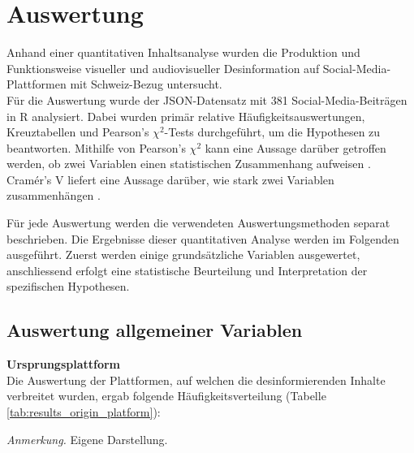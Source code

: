 \documentclass[12pt,a4paper]{article}        %
\begin{document}
\pagebreak
\section{Auswertung}
\label{sec:results}
Anhand einer quantitativen Inhaltsanalyse wurden die Produktion und Funktionsweise visueller und audiovisueller Desinformation auf Social-Media-Plattformen mit Schweiz-Bezug untersucht.\\
Für die Auswertung wurde der JSON-Datensatz mit 381 Social-Media-Beiträgen in R analysiert. Dabei wurden primär relative Häufigkeitsauswertungen, Kreuztabellen und Pearson’s \(\chi^2\)-Tests durchgeführt, um die Hypothesen zu beantworten. Mithilfe von Pearson’s \(\chi^2\) kann eine Aussage darüber getroffen werden, ob zwei Variablen einen statistischen Zusammenhang aufweisen \parencite{turney_chi-square_2022}. Cramér's V liefert eine Aussage darüber, wie stark zwei Variablen zusammenhängen \parencite{learn_statistics_easily_cramers_2024}.

Für jede Auswertung werden die verwendeten Auswertungsmethoden separat beschrieben. Die Ergebnisse dieser quantitativen Analyse werden im Folgenden ausgeführt. Zuerst werden einige grundsätzliche Variablen ausgewertet, anschliessend erfolgt eine statistische Beurteilung und Interpretation der spezifischen Hypothesen.
\subsection{Auswertung allgemeiner Variablen}
\textbf{Ursprungsplattform}\\
Die Auswertung der Plattformen, auf welchen die desinformierenden Inhalte verbreitet wurden, ergab folgende Häufigkeitsverteilung (Tabelle \ref{tab:results_origin_platform}):

\begin{table}[H]
  \caption{\textit{Relative Häufigkeitsverteilung der Ursprungsplattformen der desinformierenden Beiträge in \%}}
  \label{tab:results_origin_platform}
  \centering
  \footnotesize\textit{Anmerkung.} Eigene Darstellung.
\end{table}
\end{document}
